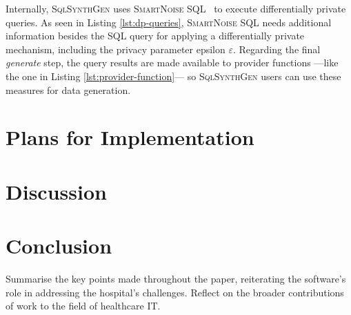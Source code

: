 \documentclass[11pt]{article}
\begin{document}
Internally, \textsc{SqlSynthGen} uses \textsc{SmartNoise SQL}~\cite{allen2020opendp} to execute differentially private queries.
As seen in Listing \ref{lst:dp-queries}, \textsc{SmartNoise SQL} needs additional information besides the SQL query for applying a differentially private mechanism, including the privacy parameter epsilon $\varepsilon$.
Regarding the final \emph{generate} step, the query results are made available to provider functions ---like the one in Listing \ref{lst:provider-function}--- so \textsc{SqlSynthGen} users can use these measures for data generation. 





\section{Plans for Implementation}


\section{Discussion}

\section{Conclusion}
Summarise the key points made throughout the paper, reiterating the software's role in addressing the hospital's challenges.
Reflect on the broader contributions of work to the field of healthcare IT.



\end{document}
